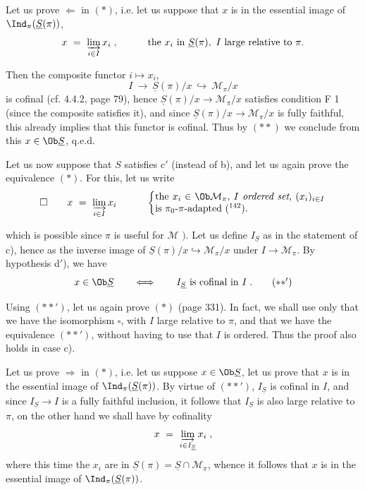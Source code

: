 Let us prove $\Longleftarrow$ in $(*)$, i.e. let us suppose that $x$ is in the essential image of $\Ind_\pi(\underline{S}(\pi))$,
\[
x \ = \ \varinjlim_{i\in I} x_i \; , \qquad\quad \text{the } x_i \text{ in } \underline{S}(\pi),\ I \text{ large relative to } \pi.
\]

Then the composite functor $i \longmapsto x_i$,
\[
I \ \longrightarrow \ \underline{S}(\pi)/x \ \hookrightarrow \ \mathcal{M}_\pi/x
\]
is cofinal (cf. 4.4.2, page 79), hence $\underline{S}(\pi)/x \longrightarrow \mathcal{M}_\pi/x$ satisfies condition F 1 (since the composite satisfies it), and since $\underline{S}(\pi)/x \longrightarrow \mathcal{M}_\pi/x$ is fully faithful, this already implies that this functor is cofinal. Thus by $(**)$ we conclude from this $x \in \Ob\underline{S}$, q.e.d.

Let us now suppose that $S$ satisfies c$'$ (instead of b), and let us again prove the equivalence $(*)$. For this, let us write
\[
\square \qquad x \ = \ \varinjlim_{i\in I} x_i \qquad\quad
\left\{
\begin{minipage}[c]{0.5\textwidth}
the $x_i \in \Ob\mathcal{M}_\pi$, $I$ \textit{ordered set}, $(x_i)_{i\in I}$ is $\pi_0$-$\pi$-adapted (\footnotemark[142]).
\end{minipage}
\right.
\]

which is possible since $\pi$ is useful for $\mathcal{M}$ $\Bigg)$. Let us define $I_{\underline{S}}$ as in the statement of c), hence as the inverse image of $\underline{S}(\pi)/x \hookrightarrow \mathcal{M}_\pi/x$ under $I \longrightarrow \mathcal{M}_\pi$. By hypothesis d$'$), we have
\[
x \in \Ob\underline{S} \qquad \Longleftrightarrow \qquad I_{\underline{S}} \text{ is cofinal in } I \; . \tag*{$(**')$}
\]

Using $(**')$, let us again prove $(*)$ (page 331). In fact, we shall use only that we have
the isomorphism $\square$, with $I$ large relative to $\pi$, and that we have the equivalence $(**')$, without having to use that $I$ is ordered. Thus the proof also holds in case c).

Let us prove $\Longrightarrow$ in $(*)$, i.e. let us suppose $x \in \Ob\underline{S}$, let us prove that $x$ is in the essential image of $\Ind_\pi(\underline{S}(\pi))$. By virtue of $(**')$, $I_{\underline{S}}$ is cofinal in $I$, and since $I_{\underline{S}} \longrightarrow I$ is a fully faithful inclusion, it follows that $I_{\underline{S}}$ is also large relative to $\pi$, on the other hand we shall have by cofinality
\[
x \ = \ \varinjlim_{i\in I_{\underline{S}}} x_i \; ,
\]
where this time the $x_i$ are in $\underline{S}(\pi) = \underline{S}\cap\mathcal{M}_\pi$, whence it follows that $x$ is in the essential image of $\Ind_\pi(\underline{S}(\pi))$.


